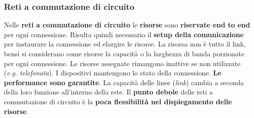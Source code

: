 \documentclass[11pt,a4paper]{article}
\theoremstyle{definition}
\begin{document}
\subsubsection{Reti a commutazione di circuito}
Nelle \textbf{reti a commutazione di circuito} le \textbf{risorse} sono \textbf{riservate end to end} per ogni connessione. Risulta quindi necessario il \textbf{setup della comunicazione} per instaurare la connessione ed elargire le risorse.\newline
La risorsa non è tutto il link, bensì si considerano come risorse la capacità o la larghezza di banda porzionate per ogni connessione. Le risorse assegnate rimangono inattive se non utilizzate (\textit{e.g. telefonata}). I dispositivi mantengono lo stato della connessione. \textbf{Le performance sono garantite}. La capacità delle linee (\textit{link}) cambia a seconda della loro funzione all'interno della rete. Il \textbf{punto debole} delle reti a commutazione di circuito è la \textbf{poca flessibilità nel dispiegamento delle risorse}.
\end{document}
